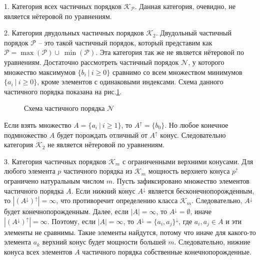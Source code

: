 \documentclass[12pt]{article}
\theoremstyle{break}
\def\P{\mathcal{P}}
\def\K{\mathcal{K}_m}
\begin{document}
		1. Категория всех частичных порядков $\mathcal{K}_{\P}.$ Данная категория, очевидно, не является нётеровой по уравнениям.

		2. Категория двудольных частичных порядков $\mathcal{K}_2$. Двудольный частичный порядок $\P$ -- это такой частичный порядок, который представим как $\P = \max(\P)\cup~\min(\P)$. Эта категория так же не является нётеровой по уравнениям. Достаточно рассмотреть частичный порядок $\mathcal{N}$, у которого множество максимумов $\{b_i\ |\ i\geqslant 0\}$ сравнимо со всем множеством минимумов $\{a_i\ |\ i\geqslant 0\}$, кроме элементов с одинаковыми индексами. Схема данного частичного порядка показана на рис.\ref{bipartPoset}.

		\begin{figure}[h]
			\begin{center}
				\caption{Схема частичного порядка $\mathcal{N}$}
				\label{bipartPoset}
			\end{center}
		\end{figure}

		Если взять множество $A = \{a_i~|~i\geqslant 1\}$, то $A^{\uparrow} = \{b_0\}$. Но любое конечное подмножество $A$ будет порождать отличный от $A^{\uparrow}$ конус. Следовательно категория $\mathcal{K}_2$ не является нётеровой по уравнениям.

		3. Категория частичных порядков $\K$ с ограниченными верхними конусами. Для любого элемента $p$ частичного порядка из $\K$ мощность верхнего конуса $p^{\uparrow}$ ограничено натуральным числом $m$. Пусть зафиксировано множество элементов частичного порядка $A$. Если нижний конус $A^{\downarrow}$ является бесконечнопорожденным, то $|(A^{\downarrow})^{\uparrow}| = \infty$, что противоречит определению класса $\K$. Следовательно, $A^{\downarrow}$ будет конечнопорожденным. Далее, если $|A| = \infty$, то $A^{\downarrow} = \emptyset$, иначе $|(A^{\downarrow})^{\uparrow}| = \infty$. Поэтому, если $|A|=\infty$, то $A^{\downarrow} = \{a_i, a_j\}^{\downarrow}$, где $a_i, a_j\in A$ и эти элементы не сравнимы. Такие элементы найдутся, потому что иначе для какого-то элемента $a_k$ верхний конус будет мощности большей $m$. Следовательно, нижние конуса всех элементов $A$ частичного порядка собственные конечнопорожденные.
\end{document}
